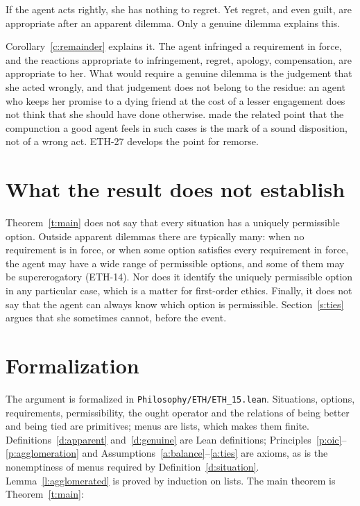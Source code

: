 \documentclass{situationist-preprint}
\begin{document}
\begin{objection}[Residue]
If the agent acts rightly, she has nothing to regret. Yet regret, and even guilt, are appropriate after an apparent dilemma. Only a genuine dilemma explains this.
\end{objection}

\begin{reply}
Corollary~\ref{c:remainder} explains it. The agent infringed a requirement in force, and the reactions appropriate to infringement, regret, apology, compensation, are appropriate to her. What would require a genuine dilemma is the judgement that she acted wrongly, and that judgement does not belong to the residue: an agent who keeps her promise to a dying friend at the cost of a lesser engagement does not think that she should have done otherwise. \citet{Hare1981} made the related point that the compunction a good agent feels in such cases is the mark of a sound disposition, not of a wrong act. ETH-27 develops the point for remorse.
\end{reply}

\section{What the result does not establish}

Theorem~\ref{t:main} does not say that every situation has a uniquely permissible option. Outside apparent dilemmas there are typically many: when no requirement is in force, or when some option satisfies every requirement in force, the agent may have a wide range of permissible options, and some of them may be supererogatory (ETH-14). Nor does it identify the uniquely permissible option in any particular case, which is a matter for first-order ethics. Finally, it does not say that the agent can always know which option is permissible. Section~\ref{s:ties} argues that she sometimes cannot, before the event.

\section{Formalization}

The argument is formalized in \nolinkurl{Philosophy/ETH/ETH_15.lean}. Situations, options, requirements, permissibility, the ought operator and the relations of being better and being tied are primitives; menus are lists, which makes them finite. Definitions~\ref{d:apparent} and~\ref{d:genuine} are Lean definitions; Principles~\ref{p:oic}--\ref{p:agglomeration} and Assumptions~\ref{a:balance}--\ref{a:ties} are axioms, as is the nonemptiness of menus required by Definition~\ref{d:situation}. Lemma~\ref{l:agglomerated} is proved by induction on lists. The main theorem is Theorem~\ref{t:main}:
\end{document}

